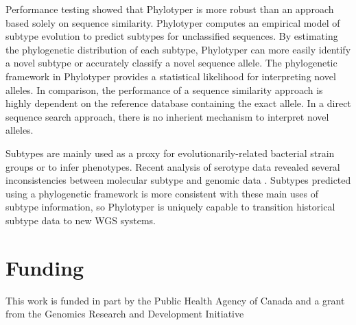 \documentclass{bioinfo}
\begin{document}
Performance testing showed that Phylotyper is more robust than an approach based solely on sequence similarity.
Phylotyper computes an empirical model of subtype evolution to predict subtypes for unclassified sequences.
By estimating the phylogenetic distribution of each subtype, Phylotyper can more easily identify a novel subtype or accurately classify a novel sequence allele.
The phylogenetic framework in Phylotyper provides a statistical likelihood for interpreting novel alleles.
In comparison, the performance of a sequence similarity approach is highly dependent on the reference database containing the exact allele.
In a direct sequence search approach, there is no inherient mechanism to interpret novel alleles.

Subtypes are mainly used as a proxy for evolutionarily-related bacterial strain groups or to infer phenotypes.
Recent analysis of serotype data revealed several inconsistencies between molecular subtype and genomic data \citep{DebRoy2016}.
Subtypes predicted using a phylogenetic framework is more consistent with these main uses of subtype information, so 
Phylotyper is uniquely capable to transition historical subtype data to new WGS systems.\vspace*{-10pt}

\section*{Funding}

This work is funded in part by the Public Health Agency of Canada and a grant from the Genomics Research and Development Initiative\vspace*{-12pt}




\end{document}
